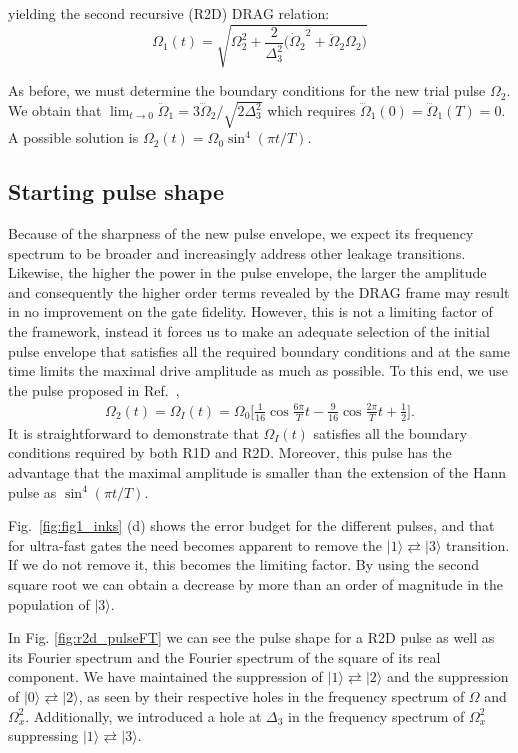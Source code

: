 \documentclass[superscriptaddress,amsmath,amssymb,aps,twocolumn,praplied,notitlepage]{revtex4-2}
\newcommand{\ket}[1]{\vert #1 \rangle}
\begin{document}
yielding the second recursive (R2D) DRAG relation:
\begin{equation}
\label{recursion}
    \Omega_1(t) = \sqrt{\Omega_2^2+\frac{2}{\Delta_3^2}\big({\dot\Omega_2}^2+\ddot{\Omega}_2\Omega_2\big)}
\end{equation}

As before, we must determine the boundary conditions for the new trial pulse $\Omega_2$. We obtain that $\lim_{t\to 0} \ddot{\Omega}_1 = 3\dddot{\Omega}_2/\sqrt{2\Delta_3^2}$ which requires $\dddot{\Omega}_1(0)=\dddot{\Omega}_1(T)=0$.  A possible solution is $\Omega_{2}(t)=\Omega_{0}\sin^4(\pi t/T)$.


\subsection{Starting pulse shape}
Because of the sharpness of the new pulse envelope, we expect its frequency spectrum to be  broader and increasingly address other leakage transitions. Likewise, the higher the power in the pulse envelope, the larger the amplitude and consequently the higher order terms revealed by the DRAG frame may result in no improvement on the gate fidelity. 
However, this is not a limiting factor of the framework, instead it forces us to make an adequate selection of the initial pulse envelope that satisfies all the required boundary conditions and at the same time limits the maximal drive amplitude as much as possible. To this end, we  use the pulse proposed in Ref.~\cite{li2024universal},
\begin{eqnarray}
\label{eq:bl_pulse}
    \Omega_2(t)=\Omega_I(t) = \Omega_{{0}}\bigg[ \frac{1}{16}\cos{\frac{6\pi}{T}t}-\frac{9}{16}\cos{\frac{2\pi}{T}t}+\frac{1}{2}\bigg].
\end{eqnarray}
It is straightforward to demonstrate that $\Omega_I(t)$ satisfies all the boundary conditions required by both R1D and R2D. Moreover, this pulse has the advantage that the maximal amplitude is smaller than the  extension of the Hann pulse as $\sin^4(\pi t/T)$.

{Fig.~\ref{fig:fig1_inks} (d) shows the error budget for the different pulses, and that for ultra-fast gates the need becomes apparent to remove the $\ket{1}\rightleftarrows\ket{3}$ transition. If we do not remove it, this becomes the limiting factor. By using the second square root we can obtain a decrease by more than an order of magnitude in the population of $|3\rangle$.}


{ In Fig. \ref{fig:r2d_pulseFT} we can see the pulse shape for a R2D pulse as well as its Fourier spectrum and the Fourier spectrum of the square of its real component. We have maintained the suppression of $\ket{1}\rightleftarrows\ket{2}$ and the suppression of $\ket{0}\rightleftarrows\ket{2}$, as seen by their respective holes in the frequency spectrum of $\Omega$ and $\Omega_x^2$. Additionally, we introduced a hole at $\Delta_3$ in the frequency spectrum of $\Omega_x^2$ suppressing $\ket{1}\rightleftarrows\ket{3}$. }
\end{document}
